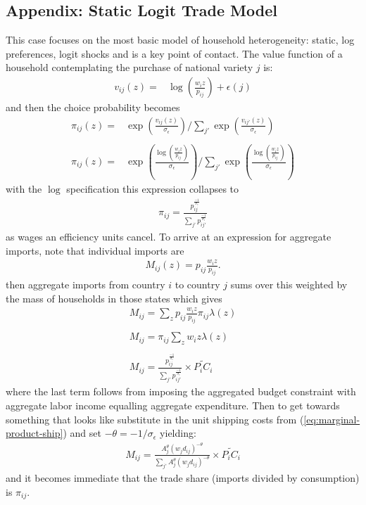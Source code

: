 \documentclass[12pt,pdftex]{article}
\begin{document}
\begin{onehalfspacing}


\section{Appendix: Static Logit Trade Model}

This case focuses on the most basic model of household heterogeneity: static, log preferences, logit shocks and is a key point of contact.  The value function of a household contemplating the purchase of national variety $j$ is:
\begin{align}
v_{ij}( z ) = &   \log\left( \frac{w_{i} z}{p_{ij}} \right) + \epsilon(j)
\end{align}
and then the choice probability becomes
\begin{align}
\pi_{ij}(z) = & \exp \left( \frac{ v_{ij}(z) }{\sigma_{\epsilon}} \right) \Bigg / \sum_{j'} \exp \left( \frac{ v_{ij'}(z) }{\sigma_{\epsilon}} \right) \\
\nonumber\\
\pi_{ij}(z) = & \exp \left( \frac{ \log\left( \frac{w_{i}z}{p_{ij}} \right) }{\sigma_{\epsilon}} \right) \Bigg / \sum_{j'} \exp \left( \frac{  \log\left( \frac{w_{i}z}{p_{ij}} \right) }{\sigma_{\epsilon}} \right)
\end{align}
with the $\log$ specification this expression collapses to
\begin{align}
\pi_{ij} = \frac{p_{ij}^{\frac{-1}{\sigma_{\epsilon}}}}{\sum_{j'} p_{ij'}^{\frac{-1}{\sigma_{\epsilon}}}}
\end{align}
as wages an efficiency units cancel. To arrive at an expression for aggregate imports, note that individual imports are
\begin{align}
M_{ij}(z) = p_{ij} \frac{w_{i}z}{p_{ij}}.
\end{align}
then aggregate imports from country $i$ to country $j$ sums over this weighted by the mass of households in those states which gives
\begin{align}
M_{ij} = \sum_{z} p_{ij} \frac{w_{i}z}{p_{ij}} \pi_{ij} \lambda(z) \\
\nonumber \\
M_{ij} = \pi_{ij} \sum_{z} w_{i}z \lambda(z)\\
\nonumber \\
M_{ij} =  \frac{p_{ij}^{\frac{-1}{\sigma_{\epsilon}}}}{\sum_{j'} p_{ij'}^{\frac{-1}{\sigma_{\epsilon}}}} \times \widetilde{P_{i} C_{i}}
\end{align}
where the last term follows from imposing the aggregated budget constraint with aggregate labor income equalling aggregate expenditure. Then to get towards something that looks like \citet{eaton2002technology} substitute in the unit shipping costs from (\ref{eq:marginal-product-ship}) and set $-\theta = -1/ \sigma_{\epsilon}$ yielding:
\begin{align}
M_{ij} =  \frac{A_j^{\theta}(w_jd_{ij})^{-\theta}}{\sum_{j'} A_j^{\theta}(w_jd_{ij})^{-\theta}} \times \widetilde{P_{i} C_{i}}
\end{align}
and it becomes immediate that the trade share (imports divided by consumption) is $\pi_{ij}$.


\end{onehalfspacing}
\end{document}
